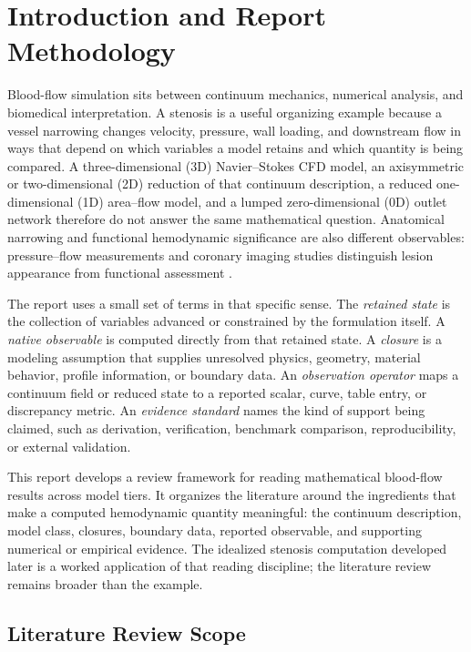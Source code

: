 \section{Introduction and Report Methodology}
\label{sec:intro}

Blood-flow simulation sits between continuum mechanics, numerical analysis,
and biomedical interpretation. A stenosis is a useful organizing example
because a vessel narrowing changes velocity, pressure, wall loading, and
downstream flow in ways that depend on which variables a model retains and
which quantity is being compared. A three-dimensional (3D) Navier--Stokes CFD model, an
axisymmetric or two-dimensional (2D) reduction of that continuum description,
a reduced one-dimensional (1D) area--flow model, and a lumped
zero-dimensional (0D) outlet network therefore do not answer the same
mathematical question. Anatomical narrowing and
functional hemodynamic significance are also different observables:
pressure--flow measurements and coronary imaging studies distinguish lesion
appearance from functional assessment
\cite[p.~4401]{DerimayEtAl2021CoronaryStenosisObstruction}
\cite[Abstract; Methods]{VanDenHoogenEtAl2022CoronaryLesionCTA}.

The report uses a small set of terms in that specific sense. The
\emph{retained state} is the collection of variables advanced or constrained by
the formulation itself. A \emph{native observable} is computed directly from
that retained state. A \emph{closure} is a modeling assumption that supplies
unresolved physics, geometry, material behavior, profile information, or
boundary data. An \emph{observation operator} maps a continuum field or reduced
state to a reported scalar, curve, table entry, or discrepancy metric. An
\emph{evidence standard} names the kind of support being claimed, such as
derivation, verification, benchmark comparison, reproducibility, or external
validation.

This report develops a review framework for reading mathematical blood-flow
results across model tiers. It organizes the literature around the ingredients
that make a computed hemodynamic quantity meaningful: the continuum description,
model class, closures, boundary data, reported observable, and supporting
numerical or empirical evidence. The idealized stenosis computation developed
later is a worked application of that reading discipline; the literature review
remains broader than the example.

\subsection{Literature Review Scope}
\label{subsec:narrative-review-scope}

